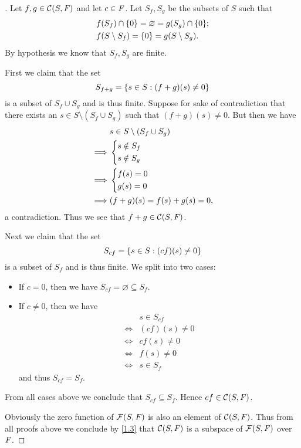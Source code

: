 \begin{proof}[]
  Let \(f, g \in \mathcal{C}(S, \mathit{F})\) and let \(c \in \mathit{F}\).
  Let \(S_f, S_g\) be the subsets of \(S\) such that
  \begin{align*}
     & f(S_f) \cap \set{0} = \varnothing = g(S_g) \cap \set{0}; \\
     & f(S \setminus S_f) = \set{0} = g(S \setminus S_g).
  \end{align*}
  By hypothesis we know that \(S_f, S_g\) are finite.

  First we claim that the set
  \[
    S_{f + g} = \left\lbrace s \in S : (f + g)(s) \neq 0\right\rbrace
  \]
  is a subset of \(S_f \cup S_g\) and is thus finite.
  Suppose for sake of contradiction that there exists an \(s \in S \setminus (S_f \cup S_g)\) such that \((f + g)(s) \neq 0\).
  But then we have
  \begin{align*}
             & s \in S \setminus (S_f \cup S_g) \\
    \implies & \begin{dcases}
                 s \notin S_f \\
                 s \notin S_g
               \end{dcases}                    \\
    \implies & \begin{dcases}
                 f(s) = 0 \\
                 g(s) = 0
               \end{dcases}                    \\
    \implies & (f + g)(s) = f(s) + g(s) = 0,
  \end{align*}
  a contradiction.
  Thus we see that \(f + g \in \mathcal{C}(S, \mathit{F})\).

  Next we claim that the set
  \[
    S_{cf} = \left\lbrace s \in S : (cf)(s) \neq 0\right\rbrace
  \]
  is a subset of \(S_f\) and is thus finite.
  We split into two cases:
  \begin{itemize}
    \item  If \(c = 0\), then we have \(S_{cf} = \varnothing \subseteq S_f\).
    \item If \(c \neq 0\), then we have
          \begin{align*}
                 & s \in S_{cf}   \\
            \iff & (cf)(s) \neq 0 \\
            \iff & c f(s) \neq 0  \\
            \iff & f(s) \neq 0    \\
            \iff & s \in S_f
          \end{align*}
          and thus \(S_{cf} = S_f\).
  \end{itemize}
  From all cases above we conclude that \(S_{cf} \subseteq S_f\).
  Hence \(cf \in \mathcal{C}(S, \mathit{F})\).

  Obviously the zero function of \(\mathcal{F}(S, \mathit{F})\) is also an element of \(\mathcal{C}(S, \mathit{F})\).
  Thus from all proofs above we conclude by \cref{1.3} that \(\mathcal{C}(S, \mathit{F})\) is a subspace of \(\mathcal{F}(S, \mathit{F})\) over \(\mathit{F}\).
\end{proof}

